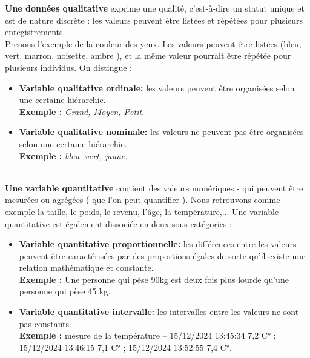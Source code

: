 \documentclass[a4paper,14pt]{article}
\begin{document}
            \textbf{Une données qualitative} exprime une qualité, c'est-à-dire un statut unique et est de nature discrète : les valeurs peuvent être listées et répétées pour plusieurs enregistrements. \\ 
            
            Prenons l'exemple de la couleur des yeux. Les valeurs peuvent être listées   (bleu, vert, marron, noisette, ambre ), et la même valeur pourrait être répétée pour plusieurs individus.
            On distingue : 
            \begin{itemize}
                \item \textbf{Variable qualitative ordinale:} les valeurs peuvent être organisées selon une certaine hiérarchie.\\
                \textbf{Exemple :} \textit{Grand, Moyen, Petit}.
                \item \textbf{Variable qualitative nominale:}  les valeurs ne peuvent pas être organisées selon une certaine hiérarchie. \\
                \textbf{Exemple :} \textit{bleu, vert, jaune.}
            \end{itemize}\\
            
           \textbf{Une variable quantitative} contient des valeurs numériques - qui peuvent être mesurées ou agrégées ( que l'on peut quantifier ). Nous retrouvons comme exemple la taille, le poids, le revenu, l'âge, la température,...
            Une variable quantitative est également dissociée en deux sous-catégories :
            
            \begin{itemize}
                \item \textbf{Variable quantitative proportionnelle:} les différences entre les valeurs peuvent être caractérisées par des proportions égales de sorte qu'il existe une relation mathématique et constante. \\
                \textbf{Exemple :} Une personne qui pèse 90kg est deux fois plus lourde qu’une personne qui pèse 45 kg.
                \item \textbf{Variable quantitative intervalle:} les intervalles entre les valeurs ne sont pas constants. \\
                \textbf{Exemple :} mesure de la température – 15/12/2024 13:45:34 7,2 C° ; 15/12/2024 13:46:15 7,1 C° ; 15/12/2024 13:52:55 7,4 C°.
            \end{itemize}\\
            
\end{document}
